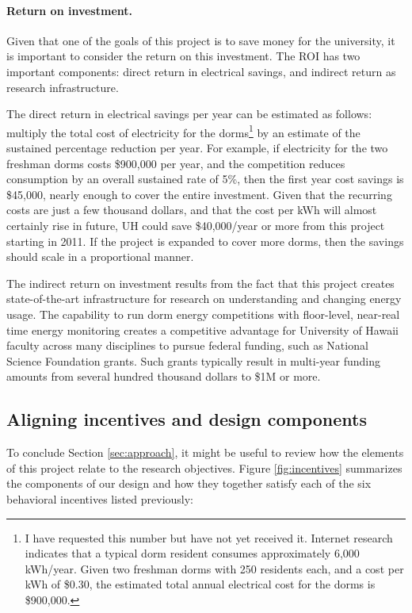 \documentclass[11pt]{article}
\begin{document}
\paragraph{Return on investment.}  Given that one of the goals of this
project is to save money for the university, it is important to consider
the return on this investment.  The ROI has two important components:
direct return in electrical savings, and indirect return as research
infrastructure.

The direct return in electrical savings per year can be estimated as
follows: multiply the total cost of electricity for the dorms\footnote{I
  have requested this number but have not yet received it. Internet
  research indicates that a typical dorm resident consumes approximately
  6,000 kWh/year. Given two freshman dorms with 250 residents each, and a
  cost per kWh of \$0.30, the estimated total annual electrical cost for the dorms
  is \$900,000.} by an estimate of the sustained percentage reduction per
year.  For example, if electricity for the two freshman dorms costs
\$900,000 per year, and the competition reduces consumption by an overall
sustained rate of 5\%, then the first year cost savings is \$45,000, nearly
enough to cover the entire investment.  Given that the recurring costs are
just a few thousand dollars, and that the cost per kWh will almost
certainly rise in future, UH could save \$40,000/year or more from this
project starting in 2011.  If the project is expanded to cover more dorms,
then the savings should scale in a proportional manner.

The indirect return on investment results from the fact that this project
creates state-of-the-art infrastructure for research on understanding and
changing energy usage.  The capability to run dorm energy competitions with
floor-level, near-real time energy monitoring creates a competitive
advantage for University of Hawaii faculty across many disciplines to
pursue federal funding, such as National Science Foundation grants.  Such
grants typically result in multi-year funding amounts from several hundred
thousand dollars to \$1M or more.


\subsection{Aligning incentives and design components}

To conclude Section \ref{sec:approach}, it might be useful to review how the
elements of this project relate to the research objectives.  Figure
\ref{fig:incentives} summarizes the components of our design and how they
together satisfy each of the six behavioral incentives listed previously:
\end{document}
